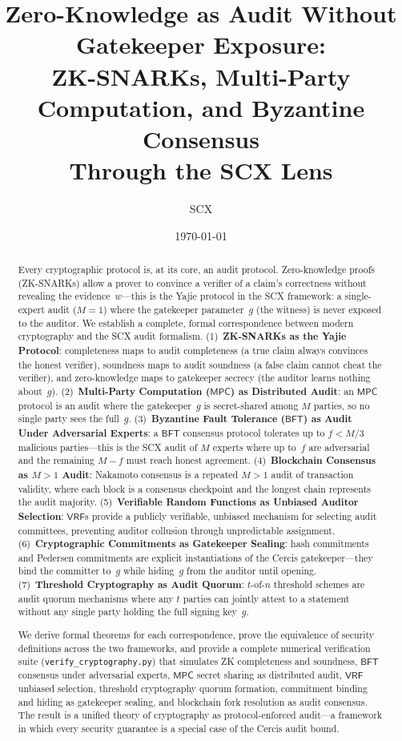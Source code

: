\documentclass[12pt,a4paper]{article}
\title{\textbf{Zero-Knowledge as Audit Without Gatekeeper Exposure:\\
ZK-SNARKs, Multi-Party Computation, and Byzantine Consensus\\
Through the SCX Lens}}
\author{SCX}
\date{\today}
\theoremstyle{remark}
\newcommand{\SCX}{\textsf{SCX}}
\newcommand{\Yajie}{\textsf{Yajie}}
\newcommand{\Cercis}{\textsf{Cercis}}
\newcommand{\MPC}{\textsf{MPC}}
\newcommand{\BFT}{\textsf{BFT}}
\newcommand{\VRF}{\textsf{VRF}}
\begin{document}
\maketitle

\begin{abstract}
Every cryptographic protocol is, at its core, an audit protocol. Zero-knowledge proofs (ZK-SNARKs) allow a prover to convince a verifier of a claim's correctness without revealing the evidence~$w$---this is the \Yajie{} protocol in the \SCX{} framework: a single-expert audit ($M = 1$) where the gatekeeper parameter~$g$ (the witness) is never exposed to the auditor. We establish a complete, formal correspondence between modern cryptography and the \SCX{} audit formalism. (1)~\textbf{ZK-SNARKs as the \Yajie{} Protocol}: completeness maps to audit completeness (a true claim always convinces the honest verifier), soundness maps to audit soundness (a false claim cannot cheat the verifier), and zero-knowledge maps to gatekeeper secrecy (the auditor learns nothing about~$g$). (2)~\textbf{Multi-Party Computation ($\MPC$) as Distributed Audit}: an $\MPC$ protocol is an audit where the gatekeeper~$g$ is secret-shared among $M$ parties, so no single party sees the full~$g$. (3)~\textbf{Byzantine Fault Tolerance ($\BFT$) as Audit Under Adversarial Experts}: a $\BFT$ consensus protocol tolerates up to $f < M/3$ malicious parties---this is the \SCX{} audit of $M$ experts where up to~$f$ are adversarial and the remaining $M-f$ must reach honest agreement. (4)~\textbf{Blockchain Consensus as $M > 1$ Audit}: Nakamoto consensus is a repeated $M > 1$ audit of transaction validity, where each block is a consensus checkpoint and the longest chain represents the audit majority. (5)~\textbf{Verifiable Random Functions as Unbiased Auditor Selection}: $\VRF$s provide a publicly verifiable, unbiased mechanism for selecting audit committees, preventing auditor collusion through unpredictable assignment. (6)~\textbf{Cryptographic Commitments as Gatekeeper Sealing}: hash commitments and Pedersen commitments are explicit instantiations of the \Cercis{} gatekeeper---they bind the committer to~$g$ while hiding~$g$ from the auditor until opening. (7)~\textbf{Threshold Cryptography as Audit Quorum}: $t$-of-$n$ threshold schemes are audit quorum mechanisms where any $t$ parties can jointly attest to a statement without any single party holding the full signing key~$g$.

We derive formal theorems for each correspondence, prove the equivalence of security definitions across the two frameworks, and provide a complete numerical verification suite (\texttt{verify\_cryptography.py}) that simulates ZK completeness and soundness, $\BFT$ consensus under adversarial experts, $\MPC$ secret sharing as distributed audit, $\VRF$ unbiased selection, threshold cryptography quorum formation, commitment binding and hiding as gatekeeper sealing, and blockchain fork resolution as audit consensus. The result is a unified theory of cryptography as protocol-enforced audit---a framework in which every security guarantee is a special case of the \Cercis{} audit bound.
\end{abstract}
\end{document}
